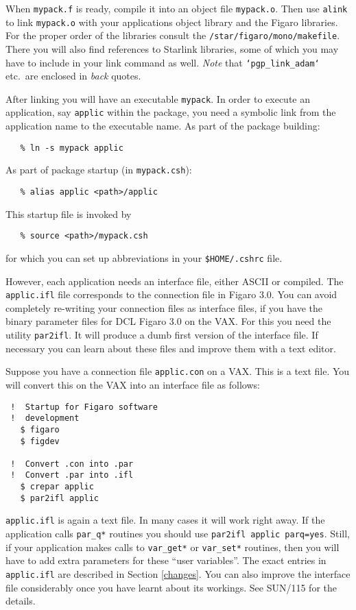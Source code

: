 When {\tt mypack.f} is ready, compile it into an
object file {\tt mypack.o}. Then use {\tt alink}
to link {\tt mypack.o} with your applications object library
and the Figaro libraries. For the proper
order of the libraries consult the {\tt /star/figaro/mono/makefile}. There you
will also find references to Starlink libraries, some of which you may have
to include in your link command as well. {\it Note} that
{\tt `pgp\_link\_adam`} etc.\ are enclosed in {\it back} quotes.

After linking you will have an executable {\tt mypack}. In order to execute an
application, say {\tt applic} within the package, you need a symbolic link from
the application name to the executable name.
As part of the package building:
\begin{verbatim}
   % ln -s mypack applic
\end{verbatim}
As part of package startup (in {\tt mypack.csh}):
\begin{verbatim}
   % alias applic <path>/applic
\end{verbatim}
This startup file is invoked by
\begin{verbatim}
   % source <path>/mypack.csh
\end{verbatim}
for which you can set up abbreviations in your {\tt \$HOME/.cshrc} file.

However, each application needs an interface file, either ASCII or compiled.
The {\tt applic.ifl} file corresponds to the connection file in Figaro 3.0.
You can avoid completely re-writing your connection files as interface
files, if you have the binary parameter files for DCL Figaro 3.0 on the VAX.
For this you need the utility {\tt par2ifl}. It will produce a dumb first
version of the interface file. If necessary you can learn about these files
and improve them with a text editor.

Suppose you have a connection file {\tt applic.con} on a VAX. This
is a text file. You will convert this on the VAX into an interface file as
follows:

\begin{verbatim}
 !  Startup for Figaro software
 !  development
   $ figaro
   $ figdev

 !  Convert .con into .par
 !  Convert .par into .ifl
   $ crepar applic
   $ par2ifl applic
\end{verbatim}

{\tt applic.ifl} is again a text file. In many cases it will work right
away.  If the application calls {\tt par\_q*} routines you should use
{\tt par2ifl applic parq=yes}. Still, if your application makes calls to
{\tt var\_get*} or {\tt var\_set*} routines, then you will have to add
extra parameters for these ``user variables''. The exact entries in {\tt
applic.ifl} are described in Section \ref{changes}. You can also improve
the interface file considerably once you have learnt about its workings.
See SUN/115 for the details.


